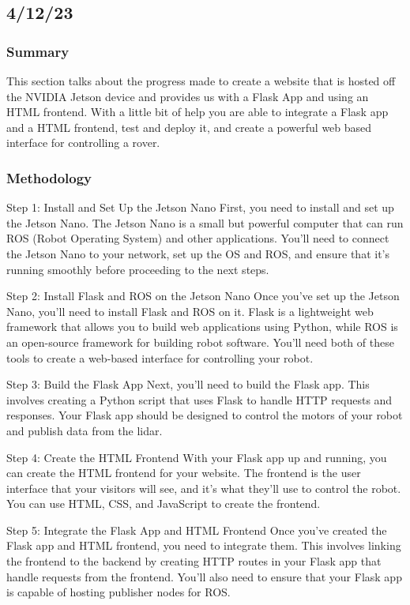 \documentclass[a4paper, 10pt]{article}
\begin{document}
    \subsection{4/12/23}
        \subsubsection{Summary}
        This section talks about the progress made to create a website that is hosted off the NVIDIA Jetson device and provides us with a Flask App and using an HTML frontend. With a little bit of help you are able to integrate a Flask app and a HTML frontend, test and deploy it, and create a powerful web based interface for controlling a rover.

        \subsubsection{Methodology}
        Step 1: Install and Set Up the Jetson Nano
        First, you need to install and set up the Jetson Nano. The Jetson Nano is a small but powerful computer that can run ROS (Robot Operating System) and other applications. You'll need to connect the Jetson Nano to your network, set up the OS and ROS, and ensure that it's running smoothly before proceeding to the next steps.
        
        Step 2: Install Flask and ROS on the Jetson Nano
        Once you've set up the Jetson Nano, you'll need to install Flask and ROS on it. Flask is a lightweight web framework that allows you to build web applications using Python, while ROS is an open-source framework for building robot software. You'll need both of these tools to create a web-based interface for controlling your robot.
        
        Step 3: Build the Flask App
        Next, you'll need to build the Flask app. This involves creating a Python script that uses Flask to handle HTTP requests and responses. Your Flask app should be designed to control the motors of your robot and publish data from the lidar.
        
        Step 4: Create the HTML Frontend
        With your Flask app up and running, you can create the HTML frontend for your website. The frontend is the user interface that your visitors will see, and it's what they'll use to control the robot. You can use HTML, CSS, and JavaScript to create the frontend.
        
        Step 5: Integrate the Flask App and HTML Frontend
        Once you've created the Flask app and HTML frontend, you need to integrate them. This involves linking the frontend to the backend by creating HTTP routes in your Flask app that handle requests from the frontend. You'll also need to ensure that your Flask app is capable of hosting publisher nodes for ROS.
        
\end{document}
